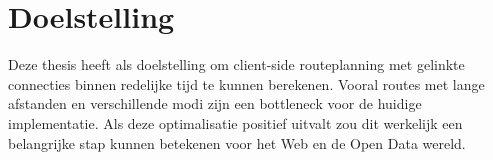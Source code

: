 \section{Doelstelling}

Deze thesis heeft als doelstelling om client-side routeplanning met gelinkte connecties binnen redelijke tijd te kunnen berekenen. Vooral routes met lange afstanden en verschillende modi zijn een bottleneck voor de huidige implementatie. 
Als deze optimalisatie positief uitvalt zou dit werkelijk een belangrijke stap kunnen betekenen voor het Web en de Open Data wereld.